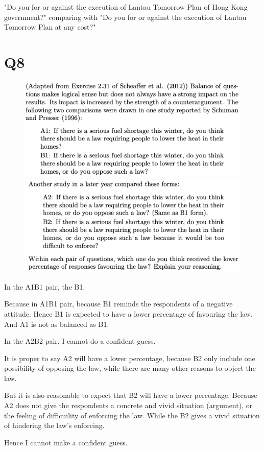 \documentclass[12pt]{article}%
\begin{document}
"Do you for or against the execution of Lantau Tomorrow Plan of Hong Kong government?" comparing with 
"Do you for or against the execution of Lantau Tomorrow Plan at any cost?"


\section{Q8}
\begin{figure}[htp]
    \includegraphics[width = 14cm]{img/Q8(1).png}
    \includegraphics[width = 14cm]{img/Q8(2).png}
\end{figure}

In the A1B1 pair, the B1.

Because in A1B1 pair, because B1 reminds the respondents of a negative attitude.
Hence B1 is expected to have a lower percentage of favouring the law. And A1 is not as balanced as B1.

In the A2B2 pair, I cannot do a confident guess.

It is proper to say A2 will have a lower percentage, because B2 only include one 
possibility of opposing the law, while there are many other reasons to object the law.

But it is also reasonable to expect that B2 will have a lower percentage.
Because A2 does not give the respondents a concrete and vivid situation (argument), 
or the feeling of difficuility of enforcing the law. 
While the B2 gives a vivid situation of hindering the law's enforcing. 

Hence I cannot make a confident guess.
\end{document}
